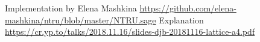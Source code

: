 \documentclass{article}
\begin{document}





\begin{thebibliography}{9}
Implementation by Elena Mashkina \url{https://github.com/elena-mashkina/ntru/blob/master/NTRU.sage}
Explanation \url{https://cr.yp.to/talks/2018.11.16/slides-djb-20181116-lattice-a4.pdf}
\end{thebibliography}
\end{document}
